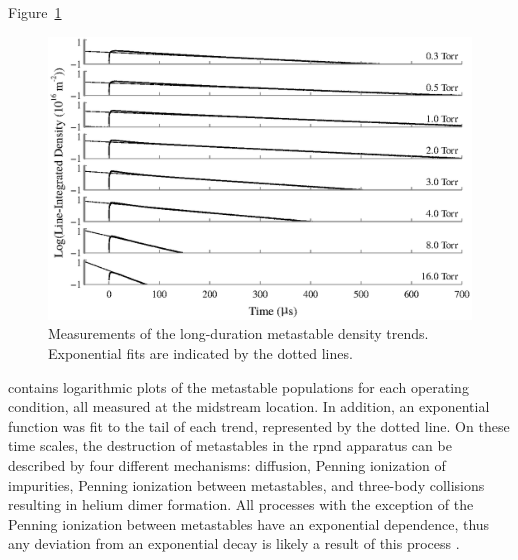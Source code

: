 Figure~\ref{fig:long}
\begin{figure}
  \centering
  \includegraphics{./chapters/metastables/figures/long.eps}
  \caption{Measurements of the long-duration metastable density trends.
  Exponential fits are indicated by the dotted lines.}
  \label{fig:long}
\end{figure}
contains logarithmic plots of the metastable populations for each operating
condition, all measured at the midstream location. In addition, an exponential
function was fit to the tail of each trend, represented by the dotted line. On
these time scales, the destruction of metastables in the \acs{rpnd} apparatus
can be described by four different mechanisms: diffusion, Penning ionization of
impurities, Penning ionization between metastables, and three-body collisions
resulting in helium dimer formation. All processes with the exception of the
Penning ionization between metastables have an exponential dependence, thus any
deviation from an exponential decay is likely a result of this process
\cite{Deloche1976}.


